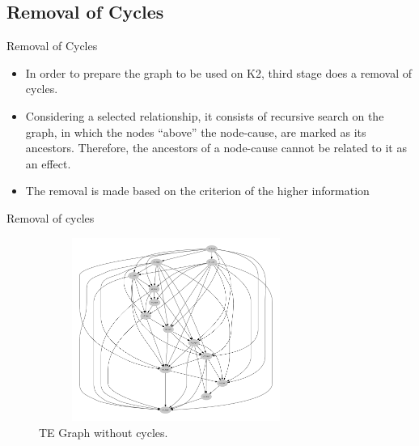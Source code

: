 \subsection{Removal of Cycles}
\begin{frame}{Removal of Cycles}
    \begin{itemize}
        \item { In order to prepare the graph to be used on K2, third stage does a removal of cycles.}
        \item Considering a selected relationship, it consists of recursive search on the graph, in which the nodes “above” the node-cause, are marked as its ancestors. Therefore, the ancestors of a node-cause cannot be related to it as an effect.
        \item {The removal is made based on the criterion of the higher information}
    \end{itemize}

\end{frame}


\begin{frame}{Removal of cycles}
    \begin{figure}
        \includegraphics[width=0.8\textwidth, height=60mm]{figuras/grafo_ac_dot_graph.pdf}
        \caption{TE Graph without cycles.}
    \end{figure}
    
\end{frame}



